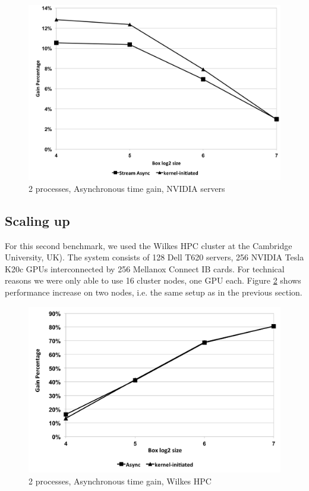 \documentclass[conference]{IEEEtran}
\begin{document}
\begin{figure}[h]
\centering
\includegraphics[scale=0.35]{gain_ivy.png}
\caption{2 processes, Asynchronous time gain, NVIDIA servers}
\label{fig:gain_ivy}
\end{figure}

\subsection{Scaling up}

For this second benchmark, we used the Wilkes HPC cluster at the Cambridge
University, UK)\cite{wilkes}.
% 
The system consists of 128 Dell T620 servers, 256 NVIDIA Tesla K20c GPUs
interconnected by 256 Mellanox Connect IB cards.
% 
For technical reasons we were only able to use 16 cluster nodes, one
GPU each.
%
Figure \ref{fig:gain_wilkes} shows performance increase on two nodes,
i.e. the same setup as in the previous section.

\begin{figure}[h]
\includegraphics[scale=0.4]{gain_wilkes.png}
\caption{2 processes, Asynchronous time gain, Wilkes HPC}
\label{fig:gain_wilkes}
\end{figure}
\end{document}
